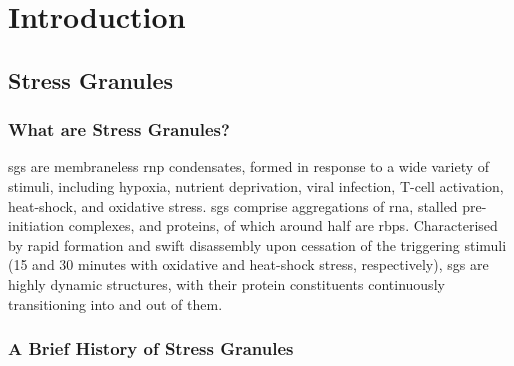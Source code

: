 \chapter{Introduction}

\section{Stress Granules}

\subsection{What are Stress Granules?}

\Glspl{sg} are membraneless \gls{rnp} condensates, formed in response to a wide variety of stimuli\cite{shin_liquid_2017}, including hypoxia, nutrient deprivation, viral infection, T-cell activation, heat-shock, and oxidative stress\cite{anderson_stress_2015, anderson_stress_2009, mccormick_translation_2017, wallace_reversible_2015, curdy_proteome_2023, paget_stress_2023}. \glspl{sg} comprise aggregations of \gls{rna}, stalled pre-initiation complexes, and proteins\cite{anderson_stress_2009}, of which around half are \glspl{rbp}\cite{nunes_msgp_2019}. Characterised by rapid formation and swift disassembly upon cessation of the triggering stimuli (15 and 30 minutes with oxidative and heat-shock stress, respectively)\cite{hofmann_translation_2012}, \glspl{sg} are highly dynamic structures, with their protein constituents continuously transitioning into and out of them\cite{ivanov_stress_2019}.

\subsection{A Brief History of Stress Granules}

